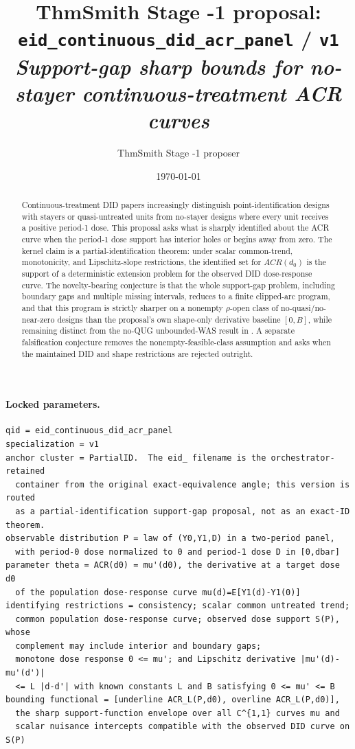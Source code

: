 \documentclass[11pt]{article}
\title{ThmSmith Stage -1 proposal: \texttt{eid\_continuous\_did\_acr\_panel} / \texttt{v1}%
  \\ \large\textit{Support-gap sharp bounds for no-stayer continuous-treatment ACR curves}}
\author{ThmSmith Stage -1 proposer}
\date{\today}
\theoremstyle{definition}
\theoremstyle{plain}
\theoremstyle{remark}
\begin{document}
\maketitle


\paragraph{Locked parameters.}
\begin{verbatim}
qid = eid_continuous_did_acr_panel
specialization = v1
anchor cluster = PartialID.  The eid_ filename is the orchestrator-retained
  container from the original exact-equivalence angle; this version is routed
  as a partial-identification support-gap proposal, not as an exact-ID theorem.
observable distribution P = law of (Y0,Y1,D) in a two-period panel,
  with period-0 dose normalized to 0 and period-1 dose D in [0,dbar]
parameter theta = ACR(d0) = mu'(d0), the derivative at a target dose d0
  of the population dose-response curve mu(d)=E[Y1(d)-Y1(0)]
identifying restrictions = consistency; scalar common untreated trend;
  common population dose-response curve; observed dose support S(P), whose
  complement may include interior and boundary gaps;
  monotone dose response 0 <= mu'; and Lipschitz derivative |mu'(d)-mu'(d')|
  <= L |d-d'| with known constants L and B satisfying 0 <= mu' <= B
bounding functional = [underline ACR_L(P,d0), overline ACR_L(P,d0)],
  the sharp support-function envelope over all C^{1,1} curves mu and
  scalar nuisance intercepts compatible with the observed DID curve on S(P)
\end{verbatim}

\begin{abstract}
Continuous-treatment DID papers increasingly distinguish point-identification designs with stayers or quasi-untreated units from no-stayer designs where every unit receives a positive period-1 dose.  This proposal asks what is sharply identified about the ACR curve when the period-1 dose support has interior holes or begins away from zero.  The kernel claim is a partial-identification theorem: under scalar common-trend, monotonicity, and Lipschitz-slope restrictions, the identified set for \(ACR(d_0)\) is the support of a deterministic extension problem for the observed DID dose-response curve.  The novelty-bearing conjecture is that the whole support-gap problem, including boundary gaps and multiple missing intervals, reduces to a finite clipped-arc program, and that this program is strictly sharper on a nonempty \(\rho\)-open class of no-quasi/no-near-zero designs than the proposal's own shape-only derivative baseline \([0,B]\), while remaining distinct from the no-QUG unbounded-WAS result in \citet{DCDHK2026NoUntreated}.  A separate falsification conjecture removes the nonempty-feasible-class assumption and asks when the maintained DID and shape restrictions are rejected outright.
\end{abstract}
\end{document}
